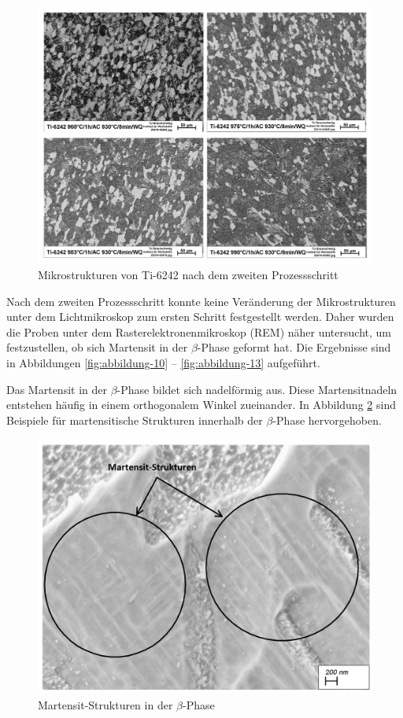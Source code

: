 \begin{figure}
	\centering
	\includegraphics[width=0.9\linewidth]{./Bilder/Abbildung 9}
	\caption[Abbildung 9]{Mikrostrukturen von Ti-6242 nach dem zweiten Prozessschritt}
	\label{fig:abbildung-9}
\end{figure}

Nach dem zweiten Prozessschritt konnte keine Veränderung der Mikrostrukturen unter dem Lichtmikroskop zum ersten Schritt festgestellt werden. Daher wurden die Proben unter dem Rasterelektronenmikroskop (REM) näher untersucht, um festzustellen, ob sich Martensit in der $\beta$-Phase geformt hat. Die Ergebnisse sind in Abbildungen \ref{fig:abbildung-10} -- \ref{fig:abbildung-13} aufgeführt. 

Das Martensit in der $\beta$-Phase bildet sich nadelförmig aus. Diese Martensitnadeln entstehen häufig in einem orthogonalem Winkel zueinander. In Abbildung \ref{fig:abbildung-21} sind Beispiele für martensitische Strukturen innerhalb der $\beta$-Phase hervorgehoben.

\begin{figure}
	\centering
	\includegraphics[width=0.8\linewidth]{./Bilder/Abbildung 21}
	\caption[Abbildung]{Martensit-Strukturen in der $\beta$-Phase}
	\label{fig:abbildung-21}
\end{figure}

